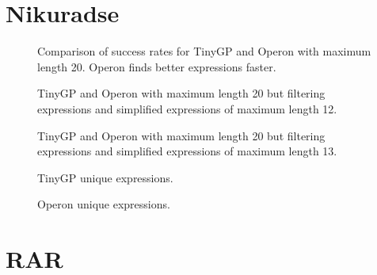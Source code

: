 \documentclass{article}
\begin{document}


\section{Nikuradse}















\begin{figure}
    
    \caption{Comparison of success rates for TinyGP and Operon with maximum length 20. Operon finds better expressions faster.}
\end{figure}

\begin{figure}
    
    \caption{TinyGP and Operon with maximum length 20 but filtering expressions and simplified expressions of maximum length 12.}
\end{figure}

\begin{figure}
    
    \caption{TinyGP and Operon with maximum length 20 but filtering expressions and simplified expressions of maximum length 13.}
\end{figure}



\begin{figure}

\caption{TinyGP unique expressions.}
\end{figure}

\begin{figure}

\caption{Operon unique expressions.}
\end{figure}

\section{RAR}



















\end{document}
